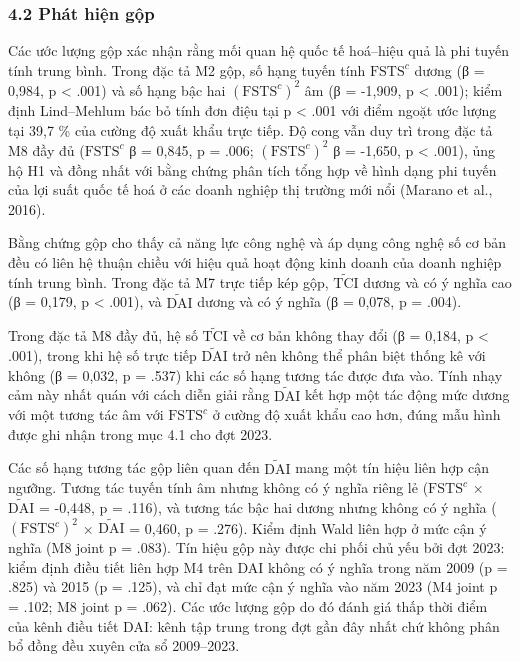 \documentclass[12pt,a4paper]{article}
\begin{document}
\hypertarget{42-phuxe1t-hiux1ec7n-gux1ed9p}{%
\subsubsection{4.2 Phát hiện gộp}\label{42-phuxe1t-hiux1ec7n-gux1ed9p}}

Các ước lượng gộp xác nhận rằng mối quan hệ quốc tế hoá--hiệu quả là phi
tuyến tính trung bình. Trong đặc tả M2 gộp, số hạng tuyến tính
\(\mathrm{FSTS}^{c}\) dương (β = 0,984, p \textless{} .001) và số hạng
bậc hai \((\mathrm{FSTS}^{c})^2\) âm (β = -1,909, p \textless{} .001);
kiểm định Lind--Mehlum bác bỏ tính đơn điệu tại p \textless{} .001 với
điểm ngoặt ước lượng tại 39,7 \% của cường độ xuất khẩu trực tiếp. Độ
cong vẫn duy trì trong đặc tả M8 đầy đủ (\(\mathrm{FSTS}^{c}\) β =
0,845, p = .006; \((\mathrm{FSTS}^{c})^2\) β = -1,650, p \textless{}
.001), ủng hộ H1 và đồng nhất với bằng chứng phân tích tổng hợp về hình
dạng phi tuyến của lợi suất quốc tế hoá ở các doanh nghiệp thị trường
mới nổi (Marano et al., 2016).

Bằng chứng gộp cho thấy cả năng lực công nghệ và áp dụng công nghệ số cơ
bản đều có liên hệ thuận chiều với hiệu quả hoạt động kinh doanh của
doanh nghiệp tính trung bình. Trong đặc tả M7 trực tiếp kép gộp,
\(\tilde{\mathrm{TCI}}\) dương và có ý nghĩa cao (β = 0,179, p
\textless{} .001), và \(\tilde{\mathrm{DAI}}\) dương và có ý nghĩa (β =
0,078, p = .004).

Trong đặc tả M8 đầy đủ, hệ số \(\tilde{\mathrm{TCI}}\) về cơ bản không
thay đổi (β = 0,184, p \textless{} .001), trong khi hệ số trực tiếp
\(\tilde{\mathrm{DAI}}\) trở nên không thể phân biệt thống kê với không
(β = 0,032, p = .537) khi các số hạng tương tác được đưa vào. Tính nhạy
cảm này nhất quán với cách diễn giải rằng \(\tilde{\mathrm{DAI}}\) kết
hợp một tác động mức dương với một tương tác âm với
\(\mathrm{FSTS}^{c}\) ở cường độ xuất khẩu cao hơn, đúng mẫu hình được
ghi nhận trong mục 4.1 cho đợt 2023.

Các số hạng tương tác gộp liên quan đến \(\tilde{\mathrm{DAI}}\) mang
một tín hiệu liên hợp cận ngưỡng. Tương tác tuyến tính âm nhưng không có
ý nghĩa riêng lẻ (\(\mathrm{FSTS}^{c}\) × \(\tilde{\mathrm{DAI}}\) =
-0,448, p = .116), và tương tác bậc hai dương nhưng không có ý nghĩa
(\((\mathrm{FSTS}^{c})^2\) × \(\tilde{\mathrm{DAI}}\) = 0,460, p =
.276). Kiểm định Wald liên hợp ở mức cận ý nghĩa (M8 joint p = .083).
Tín hiệu gộp này được chi phối chủ yếu bởi đợt 2023: kiểm định điều tiết
liên hợp M4 trên DAI không có ý nghĩa trong năm 2009 (p = .825) và 2015
(p = .125), và chỉ đạt mức cận ý nghĩa vào năm 2023 (M4 joint p = .102;
M8 joint p = .062). Các ước lượng gộp do đó đánh giá thấp thời điểm của
kênh điều tiết DAI: kênh tập trung trong đợt gần đây nhất chứ không phân
bổ đồng đều xuyên cửa sổ 2009--2023.
\end{document}

